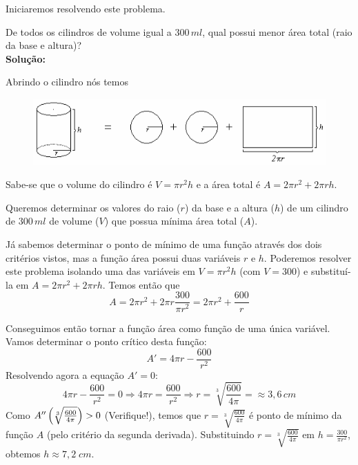 \cleardoublepage\documentclass[../main.tex]{subfiles}
\begin{document}
Iniciaremos resolvendo este problema. 
\vspace{0.5cm}
\begin{ex}
De todos os cilindros de volume igual a $300\, ml$, qual possui menor área total (raio da base e altura)?\\
\textbf{Solução:}

Abrindo o cilindro nós temos 
\begin{figure}[H]
    \centering
    \includegraphics{fig_apl_deriv/Cilindro-Planif.png}
    \end{figure}
    
    Sabe-se que o volume do cilindro é $V=\pi r^2h$ e a área total é $A=2\pi r^2+2\pi rh$. 
    
Queremos determinar os valores do raio ($r$) da base e a altura ($h$) de um cilindro de $300 \, ml$ de volume ($V$) que possua mínima área total ($A$).

Já sabemos determinar o ponto de mínimo de uma função através dos dois critérios vistos, mas a função área possui duas variáveis $r$ e $h$. Poderemos resolver este problema isolando uma das variáveis em $V=\pi r^2h$ (com $V = 300$) e substituí-la em $A=2\pi r^2+2\pi rh$.
Temos então que $$A=2\pi r^2+2\pi r\frac{300}{\pi r^2}=2\pi r^2+\frac{600}{r}$$

Conseguimos então tornar a função área como função de uma única variável. Vamos determinar o ponto crítico desta função:\\ 
$$A'=4\pi r-\frac{600}{r^2}$$
Resolvendo agora a equação $A'=0$:
$$4\pi r-\frac{600}{r^2}=0\Rightarrow 4\pi r=\frac{600}{r^2}\Rightarrow r=\sqrt[3]{\frac{600}{4\pi}}=\approx 3,6\, cm$$
Como $A''\left(\sqrt[3]{\frac{600}{4\pi}}\right)>0$ (Verifique!), temos que $r=\sqrt[3]{\frac{600}{4\pi}}$ é ponto de mínimo da função $A$ (pelo critério da segunda derivada). Substituindo $r=\sqrt[3]{\frac{600}{4\pi}}$  em $h=\frac{300}{\pi r^2}$, obtemos $h\approx 7,2\; cm$.
\end{ex}
\end{document}
